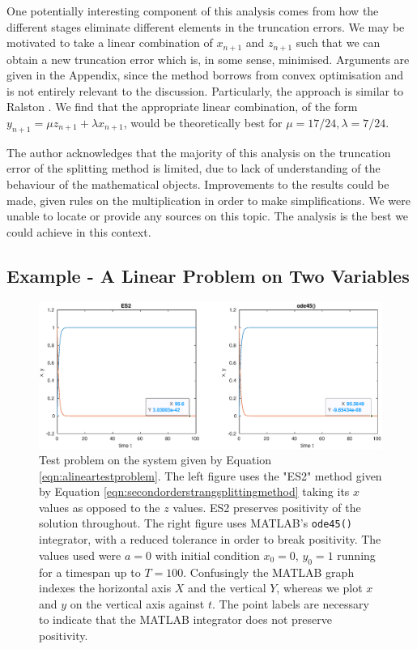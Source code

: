 One potentially interesting component of this analysis comes from how the different stages eliminate different elements in the truncation errors.
We may be motivated to take a linear combination of $x_{n+1}$ and $z_{n+1}$ such that we can obtain a new truncation error which is, in some sense, minimised.
Arguments are given in the Appendix, since the method borrows from convex optimisation \cite{boyd2004convex} and is not entirely relevant to the discussion.
Particularly, the approach is similar to Ralston \cite{ralston1962runge}.
We find that the appropriate linear combination, of the form $y_{n+1} = \mu z_{n+1} + \lambda x_{n+1}$,
would be theoretically best for $\mu = 17/24, \lambda = 7/24$.

The author acknowledges that the majority of this analysis on the truncation error of the splitting method is limited, due to lack of understanding of the behaviour of the mathematical objects.
Improvements to the results could be made, given rules on the multiplication in order to make simplifications.
We were unable to locate or provide any sources on this topic.
The analysis is the best we could achieve in this context.

\subsection{Example - A Linear Problem on Two Variables}

\begin{figure}
    \centering
    \includegraphics[width = \linewidth]{Matlab/linearproblempositivity.eps}
    \caption{
        Test problem on the system given by Equation \ref{eqn:alineartestproblem}.
        The left figure uses the "ES2" method given by Equation \ref{eqn:secondorderstrangsplittingmethod} taking its $x$ values as opposed to the $z$ values.
        ES2 preserves positivity of the solution throughout.
        The right figure uses MATLAB's \texttt{ode45()} integrator, with a reduced tolerance in order to break positivity.
        The values used were $a=0$ with initial condition $x_0 = 0$, $y_0 = 1$ running for a timespan up to $T = 100$.
        Confusingly the MATLAB graph indexes the horizontal axis $X$ and the vertical $Y$, whereas we plot $x$ and $y$ on the vertical axis against $t$.
        The point labels are necessary to indicate that the MATLAB integrator does not preserve positivity.
    }
    \label{fig:breakposlin}
\end{figure}

